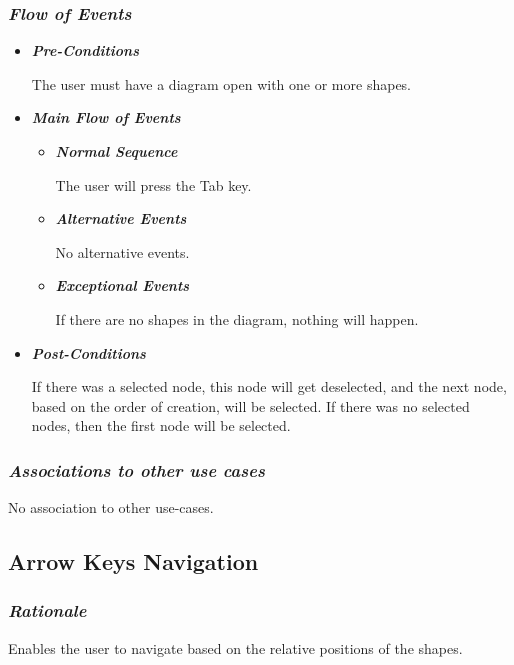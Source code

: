 \subsubsection {\em Flow of Events}
\begin{itemize}

\item {\bf \em Pre-Conditions}
\par \noindent
The user must have a diagram open with one or more shapes.

\item {\bf \em Main Flow of Events}

\begin{itemize}

\item {\bf \em Normal Sequence}
\par \noindent
The user will press the Tab key.

\item {\bf \em Alternative Events}
\par \noindent
No alternative events.

\item {\bf \em Exceptional Events}
\par \noindent
If there are no shapes in the diagram, nothing will happen.

\end{itemize}

\item {\bf \em Post-Conditions}
\par \noindent
If there was a selected node, this node will get deselected, and the next node, based on the order of creation, will be selected. If there was no selected nodes, then the first node will be selected.

\end{itemize}

\subsubsection {\em Associations to other use cases}
No association to other use-cases.

\subsection{Arrow Keys Navigation}

\subsubsection {\em Rationale}
Enables the user to navigate based on the relative positions of the shapes.

